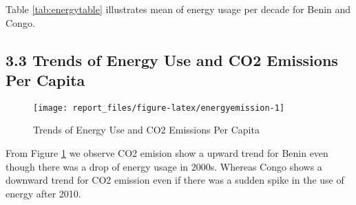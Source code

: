 \documentclass[11pt,a4paper,]{article}
\begin{document}
Table \ref{tab:energytable} illustrates mean of energy usage per decade for Benin and Congo.

\subsection*{3.3 Trends of Energy Use and CO2 Emissions Per Capita}

\begin{figure}[!h]

{\centering \texttt{[image: report\_files/figure-latex/energyemission-1]} 

}

\caption{Trends of Energy Use and CO2 Emissions Per Capita}\label{fig:energyemission}
\end{figure}

From Figure \ref{fig:energyemission} we observe CO2 emision show a upward trend for Benin even though there was a drop of energy usage in 2000s.
Whereas Congo shows a downward trend for CO2 emission even if there was a sudden spike in the use of energy after 2010.

\printbibliography
\end{document}
